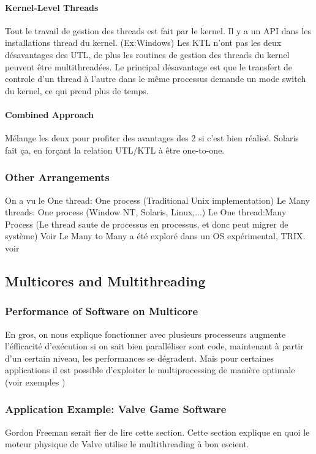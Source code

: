 \paragraph{Kernel-Level Threads}
Tout le travail de gestion des threads est fait par le kernel.
Il y a un API dans les installations thread du kernel.
(Ex:Windows)
Les KTL n'ont pas les deux désavantages des UTL, de plus les routines de gestion des threads du kernel peuvent être multithreadées.
Le principal désavantage est que le transfert de controle d'un thread à l'autre dans le même processus demande un mode switch du kernel, ce qui prend plus de temps.
\paragraph{Combined Approach}
Mélange les deux pour profiter des avantages des 2 si c'est bien réalisé.
Solaris fait ça, en forçant la relation UTL/KTL à être one-to-one.

\subsubsection{Other Arrangements}
On a vu le One thread: One process (Traditional Unix implementation)
Le Many threads: One process (Window NT, Solaris, Linux,...)
Le One thread:Many Process (Le thread saute de processus en processus, et donc peut migrer de système) Voir \cite[p.~189]{stallings} Le Many to Many a été exploré dans un OS expérimental, TRIX.
voir \cite[p.~188]{stallings}

\subsection{Multicores and Multithreading}
\subsubsection{Performance of Software on Multicore}
En gros, on nous explique fonctionner avec plusieurs processeurs augmente l'éfficacité d'exécution si on sait bien paralléliser sont code, maintenant à partir d'un certain niveau, les performances se dégradent.
Mais pour certaines applications il est possible d'exploiter le multiprocessing de manière optimale (voir exemples \cite[p.~193]{stallings})

\subsubsection{Application Example: Valve Game Software}
Gordon Freeman serait fier de lire cette section.
Cette section explique en quoi le moteur physique de Valve utilise le multithreading à bon escient.

